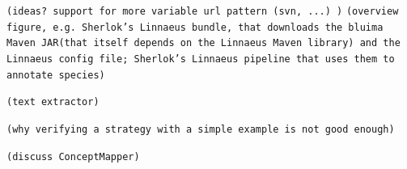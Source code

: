 \documentclass{article}
\newcommand{\JAR}{JAR\xspace}
\newcommand{\TODO}[1]{\texttt{\textcolor{YellowOrange}{(#1)}}} %
\begin{document}
\TODO{ideas? support for more variable url pattern (svn, ...) }
\TODO{overview figure, e.g.  Sherlok's Linnaeus bundle, that downloads the bluima Maven \JAR (that itself depends on the Linnaeus Maven library) and the Linnaeus config file; Sherlok's Linnaeus pipeline that uses them to annotate species}

\TODO{text extractor}


\TODO{why verifying a strategy with a simple example is not good enough}

\TODO{discuss ConceptMapper}
\end{document}
